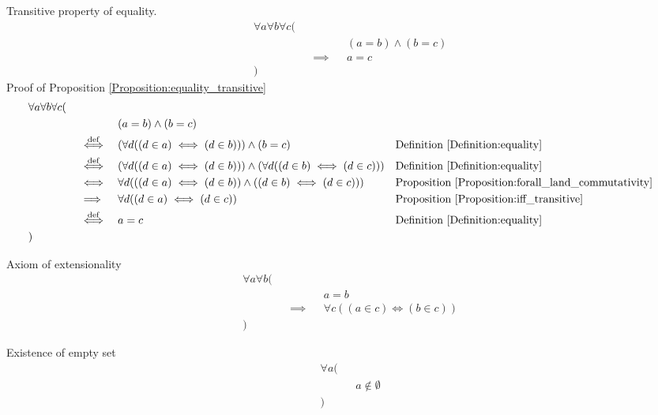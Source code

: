 \begin{prop}
\label{Proposition:equality_transitive}
Transitive property of equality.
\begin{align*}
& \forall a \forall b \forall c ( \\
& \quad && && (a = b) \land (b = c) \\
& \quad && \implies && a = c \\
& )
\end{align*}
Proof of Proposition \ref{Proposition:equality_transitive}
\begin{align*}
& \forall a \forall b \forall c ( \\
& \quad && && (a = b) \land (b = c) \\
& \quad && \overset{\operatorname{def}}{\iff} && (\forall d ((d \in a) \iff (d \in b))) \land (b = c)
&& \text{Definition \ref{Definition:equality}} \\
& \quad && \overset{\operatorname{def}}{\iff} && (\forall d ((d \in a) \iff (d \in b))) \land (\forall d ((d \in b) \iff (d \in c)))
&& \text{Definition \ref{Definition:equality}} \\
& \quad && \iff && \forall d (((d \in a) \iff (d \in b)) \land ((d \in b) \iff (d \in c)))
&& \text{Proposition \ref{Proposition:forall_land_commutativity}} \\
& \quad && \implies && \forall d ((d \in a) \iff (d \in c))
&& \text{Proposition \ref{Proposition:iff_transitive}} \\
& \quad && \overset{\operatorname{def}}{\iff} && a = c
&& \text{Definition \ref{Definition:equality}} \\
& )
\end{align*}
\end{prop}

\begin{axm}
\label{Axiom:extensionality}
Axiom of extensionality
\begin{align*}
& \forall a \forall b ( \\
& \quad && && a = b \\
& \quad && \implies && \forall c ((a \in c) \iff (b \in c)) \\
& )
\end{align*}
\end{axm}

\begin{axm}
\label{Axiom:existence_of_empty_set}
Existence of empty set
\begin{align*}
& \forall a ( \\
& \quad && a \notin \emptyset \\
& )
\end{align*}
\end{axm}

